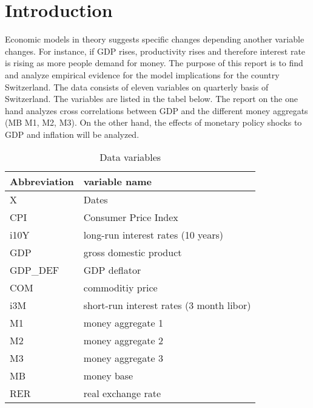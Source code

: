 \documentclass[11pt,a4paper]{report}
\begin{document}
\section*{Introduction}
Economic models in theory suggests specific changes depending another variable changes. For instance, if GDP rises, productivity rises and therefore interest rate is rising as more people demand for money. The purpose of this report is to find and analyze empirical evidence for the model implications for the country Switzerland. The data consists of eleven variables on quarterly basis of Switzerland. The variables are listed in the tabel below. The report on the one hand analyzes cross correlations between GDP and the different money aggregats (MB M1, M2, M3). On the other hand, the effects of monetary policy shocks to GDP and inflation will be analyzed. 
\newline
\begin{table}[H]
\centering
\caption{Data variables}
\label{tab: var}
\begin{tabular}{l|l}
	\textbf{Abbreviation} & \textbf{variable name}\\\hline\hline
	X & Dates\\
	CPI & Consumer Price Index \\
	i10Y & long-run interest rates (10 years) \\
	GDP & gross domestic product\\
	GDP\_DEF & GDP deflator \\
	COM & commoditiy price \\
	i3M & short-run interest rates (3 month libor) \\
	M1 & money aggregate 1 \\
	M2 & money aggregate 2 \\
	M3 & money aggregate 3 \\
	MB & money base \\
	RER & real exchange rate \\
\hline
\end{tabular}
\end{table}
 

\newpage
\end{document}
